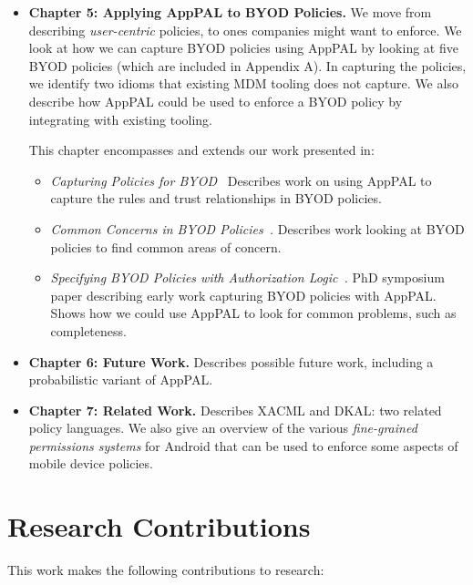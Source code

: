 \documentclass[thesis.tex]{subfiles}
\begin{document}
\begin{itemize}
\item \textbf{Chapter 5: Applying AppPAL to BYOD Policies.}
  We move from describing \emph{user-centric} policies, to ones companies might
  want to enforce. We look at how we can capture BYOD policies using AppPAL by
  looking at five BYOD policies (which are included in Appendix A). In capturing the
  policies, we identify two idioms that existing MDM tooling does not capture. We
  also describe how AppPAL could be used to enforce a BYOD policy by integrating
  with existing tooling.
  
  This chapter encompasses and extends our work presented in:
  \begin{itemize}
  \item\emph{Capturing Policies for BYOD~\cite{hallett_capturing_2017}} Describes work on using AppPAL to capture the rules and trust relationships in BYOD policies.
  \item\emph{Common Concerns in BYOD Policies~\cite{hallett_common_2017}.} Describes work looking at BYOD policies to find common areas of concern.  
  \item\emph{Specifying BYOD Policies with Authorization Logic~\cite{hallett_specifying_2016}.} PhD symposium paper describing early work capturing BYOD policies with AppPAL.  Shows how we could use AppPAL to look for common problems, such as completeness.
  \end{itemize}

\item \textbf{Chapter 6: Future Work.}
  Describes possible future work, including a probabilistic variant of AppPAL.
 
\item \textbf{Chapter 7: Related Work.} 
  Describes XACML and DKAL: two related policy languages. We also give an overview
  of the various \emph{fine-grained permissions systems} for Android that can be
  used to enforce some aspects of mobile device policies.
\end{itemize}

\section{Research Contributions}

This work makes the following contributions to research:
\end{document}
